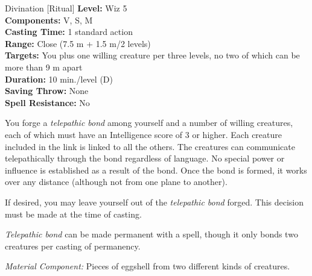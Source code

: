 {Divination [Ritual]}
{
	\textbf{Level:}
	Wiz 5\\
	\textbf{Components:}
	V, S, M\\
	\textbf{Casting Time:}
	1 standard action\\
	\textbf{Range:}
	Close (7.5 m + 1.5 m/2 levels)\\
	\textbf{Targets:}
	You plus one willing creature per three levels, no two of which can be more than 9 m apart\\
	\textbf{Duration:}
	10 min./level (D)\\
	\textbf{Saving Throw:}
	None\\
	\textbf{Spell Resistance:}
	No\\
}
{
	You forge a \emph{telepathic bond} among yourself and a number of willing creatures, each of which must have an Intelligence score of 3 or higher. Each creature included in the link is linked to all the others. The creatures can communicate telepathically through the bond regardless of language. No special power or influence is established as a result of the bond. Once the bond is formed, it works over any distance (although not from one plane to another).

	If desired, you may leave yourself out of the \emph{telepathic bond} forged. This decision must be made at the time of casting.

	\emph{Telepathic bond} can be made permanent with a  spell, though it only bonds two creatures per casting of permanency.

	\textit{Material Component:}
	Pieces of eggshell from two different kinds of creatures.

}
